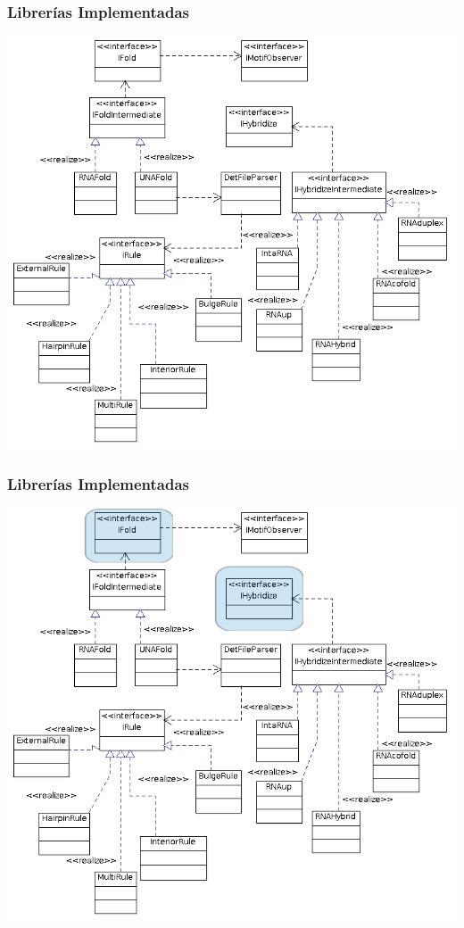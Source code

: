       \begin{frame}\frametitle{\textbf{Librerías Implementadas}}
        \begin{center}
          \includegraphics[scale=.3]{images/fideoInterface.png}
        \end{center}
      \end{frame}  

      \begin{frame}\frametitle{\textbf{Librerías Implementadas}}
        \begin{center}
           \includegraphics[scale=.3]{images/fideoInterface2.png}
        \end{center}
      \end{frame}

